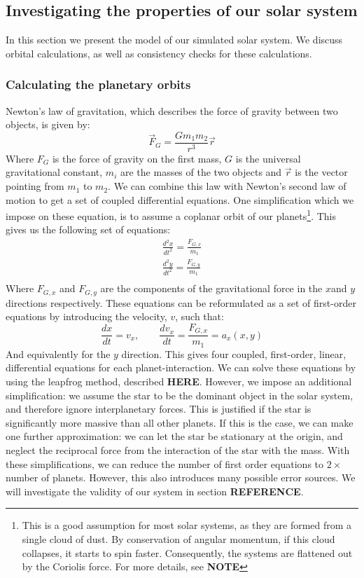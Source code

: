 \documentclass[a4paper,10pt,english]{article}
\begin{document}
\subsection{Investigating the properties of our solar system}
In this section we present the model of our simulated solar system. We discuss orbital calculations, as well as consistency checks for these calculations. 
\subsubsection{Calculating the planetary orbits}
Newton's law of gravitation, which describes the force of gravity between two objects, is given by:
\begin{equation}
\vec{F}_{G}=\frac{Gm_1m_2}{r^3}\vec{r}
\end{equation}
Where $F_G$ is the force of gravity on the first mass, $G$ is the universal gravitational constant, $m_i$ are the masses of the two objects and $\vec{r}$ is the vector pointing from $m_1$ to $m_2$. We can combine this law with Newton's second law of motion to get a set of coupled differential equations. One simplification which we impose on these equation, is to assume a coplanar orbit of our planets\footnote{This is a good assumption for most solar systems, as they are formed from a single cloud of dust. By conservation of angular momentum, if this cloud collapses, it starts to spin faster. Consequently, the systems are flattened out by the Coriolis force. For more details, see \textbf{NOTE}}. This gives us the following set of equations:
\begin{equation}\label{eq:coupled_diff}
\begin{split}
\frac{d^2x}{dt^2}=\frac{F_{G,x}}{m_1}\\
\frac{d^2 y}{dt^2}=\frac{F_{G,y}}{m_1}\\
\end{split}
\end{equation}
Where $F_{G,x}$ and $F_{G,y}$ are the components of the gravitational force in the $x$and $y$ directions respectively. These equations can be reformulated as a set of first-order equations by introducing the velocity, $v$, such that:
\begin{equation}\label{eq:Velocity_position_equation}
\frac{dx}{dt}=v_x, \quad \quad \frac{dv_x}{dt}=\frac{F_{G,x}}{m_1}=a_x(x,y)
\end{equation}
And equivalently for the $y$ direction. This gives four coupled, first-order, linear, differential equations for each planet-interaction. We can solve these equations by using the leapfrog method, described \textbf{HERE}. However, we impose an additional simplification: we assume the star to be the dominant object in the solar system, and therefore ignore interplanetary forces. This is justified if the star is significantly more massive than all other planets. If this is the case, we can make one further approximation: we can let the star be stationary at the origin, and neglect the reciprocal force from the interaction of the star with the mass. With these simplifications, we can reduce the number of first order equations to $2\times$ number of planets. However, this also introduces many possible error sources. We will investigate the validity of our system in section \textbf{REFERENCE}.
\end{document}
